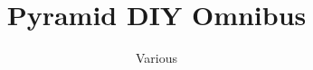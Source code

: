 \documentclass[showtrims]{memoir}
\begin{document}
\title{Pyramid DIY Omnibus}
\author{Various}
\maketitle
\begin{center}
  \centering
  \tableofcontents*
\end{center}

\end{document}

